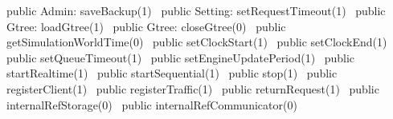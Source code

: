 public \LA{}Admin: saveBackup(1)~{\nwtagstyle{}}\RA{}
public \LA{}Setting: setRequestTimeout(1)~{\nwtagstyle{}}\RA{}
public \LA{}Gtree: loadGtree(1)~{\nwtagstyle{}}\RA{}
public \LA{}Gtree: closeGtree(0)~{\nwtagstyle{}}\RA{}
public \LA{}getSimulationWorldTime(0)~{\nwtagstyle{}}\RA{}
public \LA{}setClockStart(1)~{\nwtagstyle{}}\RA{}
public \LA{}setClockEnd(1)~{\nwtagstyle{}}\RA{}
public \LA{}setQueueTimeout(1)~{\nwtagstyle{}}\RA{}
public \LA{}setEngineUpdatePeriod(1)~{\nwtagstyle{}}\RA{}
public \LA{}startRealtime(1)~{\nwtagstyle{}}\RA{}
public \LA{}startSequential(1)~{\nwtagstyle{}}\RA{}
public \LA{}stop(1)~{\nwtagstyle{}}\RA{}
public \LA{}registerClient(1)~{\nwtagstyle{}}\RA{}
public \LA{}registerTraffic(1)~{\nwtagstyle{}}\RA{}
public \LA{}returnRequest(1)~{\nwtagstyle{}}\RA{}
public \LA{}internalRefStorage(0)~{\nwtagstyle{}}\RA{}
public \LA{}internalRefCommunicator(0)~{\nwtagstyle{}}\RA{}
\nwendcode{}\nwdocspar

